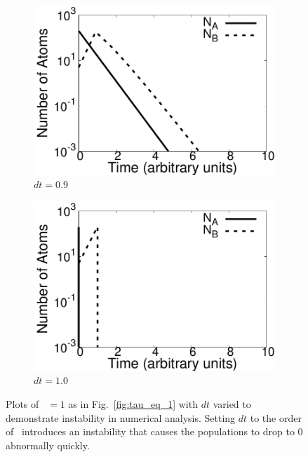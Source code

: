 \documentclass[pra,twocolumn,showpacs,amsmath,amssymb]{revtex4-1}
\begin{document}
\begin{figure}
  \begin{subfigure}{.8\linewidth}
    \includegraphics[width=\linewidth]{t_eq_1_unstable.pdf}
    \caption{ $dt = 0.9$ }
    \label{fig:tau_eq_1_unstable}
  \end{subfigure}

  \begin{subfigure}{.8\linewidth}
    \includegraphics[width=\linewidth]{t_eq_1_vunstable.pdf}
    \caption{$dt=1.0$}
    \label{fig:tau_eq_1_vunstable}
  \end{subfigure}

  \caption{Plots of \trel~$ = 1$ as in Fig.~\ref{fig:tau_eq_1} with $dt$ varied
  to demonstrate instability in numerical analysis. Setting $dt$ to the
  order of \trel~introduces an instability that causes
  the populations to drop to 0 abnormally quickly.}
\end{figure}
\end{document}
